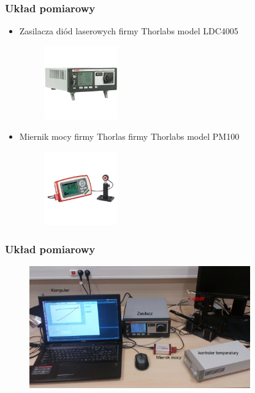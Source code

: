 \documentclass[xcolor={dvipsnames,table}]{beamer}
\begin{document}
\begin{frame}
\frametitle{Układ pomiarowy}
\begin{itemize}
\item Zasilacza diód laserowych firmy Thorlabs model LDC4005 
\begin{figure}
   \includegraphics[width=0.30\textwidth,natwidth=69,natheight=87]{ldc4005.jpg}
\end{figure}
\item Miernik mocy firmy Thorlas firmy Thorlabs model PM100
\begin{figure}
   \includegraphics[width=0.30\textwidth,natwidth=69,natheight=87]{pm100.jpg}
\end{figure}
\end{itemize}
\end{frame}

\begin{frame}
\frametitle{Układ pomiarowy}
\begin{figure}
   \includegraphics[width=0.85\textwidth,natwidth=69,natheight=87]{uklad.jpg}
\end{figure}
\end{frame}
\end{document}
